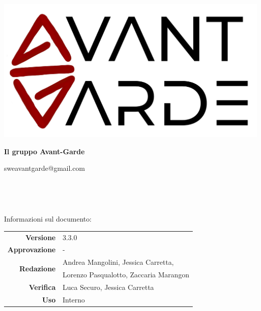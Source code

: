     \begin{titlepage}
        \begin{center}
            \includegraphics[width=\textwidth]{logo+scritta.png}

            \vspace{0.5cm}
            {\huge \textbf{Il gruppo Avant-Garde}}

            \vspace{0.4cm}
            \large{sweavantgarde@gmail.com}

            \vspace{1.5cm}
            \hrulefill\\
            \vspace{0.2cm}
            
            \textbf{\titoloDocumento}\\
           
            \hrulefill

            \vfill
            Informazioni sul documento:\\
            \vspace{0.3cm}
                \begin{tabular}{ r | l }
                    \textbf{Versione} & 3.3.0\\ %
                    \textbf{Approvazione} & -\\ %
                    \multirow{2}{*}{\textbf{Redazione}} & Andrea Mangolini, Jessica Carretta, \\ & Lorenzo Pasqualotto, Zaccaria Marangon\\ %
                    \textbf{Verifica} & Luca Securo, Jessica Carretta\\ %
                    \textbf{Uso} & Interno\\ %
                \end{tabular}
        \end{center}
    \end{titlepage}
\restoregeometry